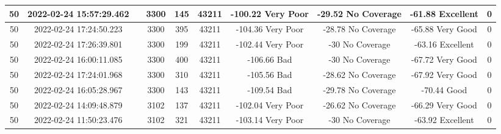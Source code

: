 \begin{longtable*}{|c|c|c|c|c|c|c|c|c|c|}
50&2022-02-24 15:57:29.462&&3300&145&43211& -100.22   Very Poor   & -29.52    No Coverage & -61.88    Excellent   & 0\\\hline
{}50&2022-02-24 17:24:50.223&&3300&395&43211& -104.36   Very Poor   & -28.78    No Coverage & -65.88    Very Good   & 0\\\hline
{}50&2022-02-24 17:26:39.801&&3300&199&43211& -102.44   Very Poor   & -30       No Coverage & -63.16    Excellent   & 0\\\hline
{}50&2022-02-24 16:00:11.085&&3300&400&43211& -106.66   Bad         & -30       No Coverage & -67.72    Very Good   & 0\\\hline
{}50&2022-02-24 17:24:01.968&&3300&310&43211& -105.56   Bad         & -28.62    No Coverage & -67.92    Very Good   & 0\\\hline
{}50&2022-02-24 16:05:28.967&&3300&143&43211& -109.54   Bad         & -29.78    No Coverage & -70.44    Good        & 0\\\hline
{}50&2022-02-24 14:09:48.879&&3102&137&43211& -102.04   Very Poor   & -26.62    No Coverage & -66.29    Very Good   & 0\\\hline
{}50&2022-02-24 11:50:23.476&&3102&321&43211& -103.14   Very Poor   & -30       No Coverage & -63.92    Excellent   & 0\\\hline

\end{longtable*}

